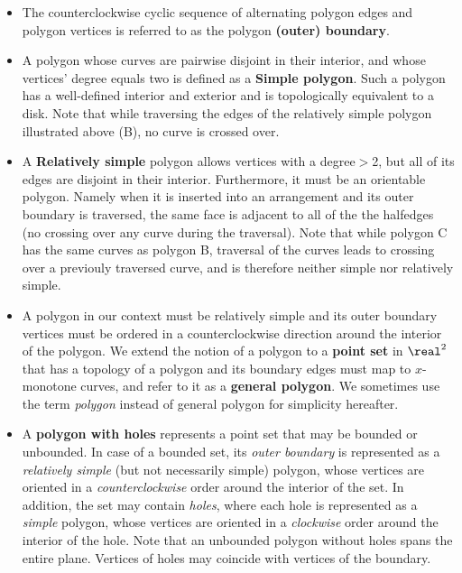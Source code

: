 \begin{itemize}

\item The counterclockwise cyclic sequence of alternating polygon edges and
polygon vertices is referred to as the polygon \textbf{(outer) boundary}.

\item A polygon whose curves are pairwise disjoint in their interior, and whose vertices' degree equals two is defined as a \textbf{Simple polygon}. Such a polygon has a well-defined interior and exterior and is topologically equivalent to a disk.  Note that while traversing the edges of the relatively simple polygon illustrated above (B), no curve is crossed over.

\item A \textbf{Relatively simple} polygon allows vertices with a degree$>$2, but all of its edges are disjoint in their interior. Furthermore, it must be an orientable polygon.  Namely when it is inserted into an arrangement and its outer boundary is traversed, the same face is adjacent to all of the the halfedges (no crossing over any curve during the traversal).  
Note that while polygon C has the same curves as polygon B, traversal of the curves leads to crossing over a previouly traversed curve, and is therefore neither simple nor relatively simple.  

\item A polygon in our context must be relatively simple and its outer boundary vertices must be ordered in a counterclockwise direction around the interior of the polygon.
We extend the notion of a polygon to a \textbf{point set} in $\real^2$
that has  a topology of a polygon and its boundary edges must map to
$x$-monotone curves, and refer to it as a \textbf{general polygon}. We
sometimes use the term {\em polygon} instead of general polygon for
simplicity hereafter.

\item A \textbf{polygon with holes} represents a point set that may
be bounded or unbounded. In case of a bounded set, its {\em outer
boundary} is represented as a {\em relatively simple } (but not necessarily simple) polygon, whose vertices are oriented in a {\em counterclockwise }
order around the interior of the set. In addition, the set may contain
{\em holes}, where each hole is represented as a {\em simple}
polygon, whose vertices are oriented in a {\em clockwise} order around the
interior of the hole. Note that an unbounded polygon without holes
spans the entire plane. Vertices of holes may coincide with vertices
of the boundary.


\end{itemize}
